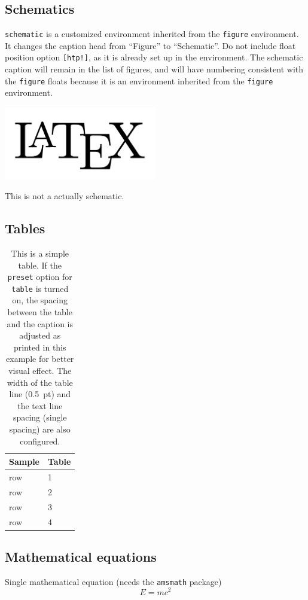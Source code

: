\documentclass[final]{emory}
\begin{document}
\subsection{Schematics}

\Verb|schematic| is a customized environment inherited from the \Verb|figure|
environment. It changes the caption head from ``Figure'' to ``Schematic''. Do 
not include float position option
\Verb|[htp!]|, as it is already set up in the environment. The schematic caption will 
remain in the list of figures, and will have numbering 
consistent with the \Verb|figure| floats because it is an environment inherited from the \Verb|figure| environment.

\begin{schematic}
	\centering
  \includegraphics[width=0.5\textwidth]{LaTeXLogo.png}
  \caption{This is not a actually schematic.\label{schematic}}
\end{schematic}


\subsection{Tables}

\begin{table}[htp!]
  \centering
  \caption[This is a simple table]{This is a simple table. \label{table} If the 
  \protect\Verb|preset| 
  option 
  	for \protect\Verb|table| is turned on, the spacing between the table and 
  	the 
  	caption is adjusted as printed in this example for better visual effect. 
  	The width of the table line (0.5~pt) and the text line spacing (single 
  	spacing) are also configured.}
  \begin{tabular}{l p{}}
    \hline
    Sample & Table \\
    \hline 
    row & 1 \\
    row & 2 \\
    row & 3 \\
    row & 4 \\
    \hline
  \end{tabular}
\end{table}

\subsection{Mathematical equations}
Single mathematical equation (needs the \Verb|amsmath| package)
\begin{equation}
  E = mc^2 \label{math:single}
\end{equation}
\end{document}
